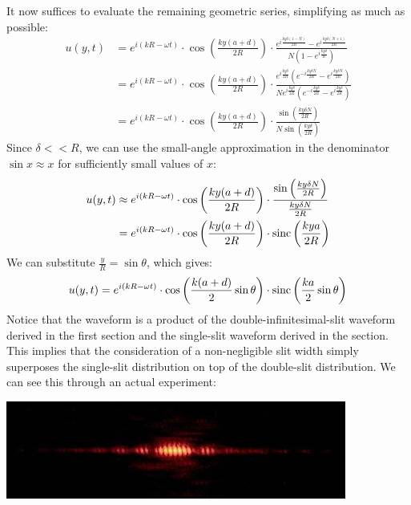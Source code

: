 It now suffices to evaluate the remaining geometric series, simplifying as much as possible: 
\begin{align*}
	u(y, t) &= e^{i(kR-\omega t)} \cdot \cos\left( \frac{ky(a+d)}{2R} \right) \cdot \frac{e^{i\frac{ky\delta (1-N)}{2R}} - e^{i\frac{ky\delta (N+1)}{2R}}}{N \left( 1 - e^{i\frac{ky\delta }{R}} \right)} \\
	&= e^{i(kR-\omega t)} \cdot \cos\left( \frac{ky(a+d)}{2R} \right) \cdot \frac{e^{i \frac{ky\delta}{2R}} \left(e^{-i\frac{ky\delta N}{2R}} - e^{i\frac{ky\delta N}{2R}}\right)}{N e^{i\frac{ky\delta }{2R}} \left( e^{-i\frac{ky\delta }{2R}} - e^{i\frac{ky\delta }{2R}} \right)} \\
	&= e^{i(kR-\omega t)} \cdot \cos\left( \frac{ky(a+d)}{2R} \right) \cdot \frac{\sin \left( \frac{ky\delta N}{2R} \right)}{N \sin \left( \frac{ky\delta }{2R} \right)}
\end{align*}
Since $\delta << R$, we can use the small-angle approximation in the denominator $\sin x \approx x$ for sufficiently small values of $x$: 
\begin{align*}
	u(y, t) &\approx e^{i(kR-\omega t)} \cdot \cos\left( \frac{ky(a+d)}{2R} \right) \cdot \frac{\sin \left( \frac{ky\delta N}{2R} \right)}{ \frac{ky\delta N}{2R} } \\
	&= e^{i(kR-\omega t)} \cdot \cos\left( \frac{ky(a+d)}{2R} \right) \cdot \operatorname{sinc} \left( \frac{kya}{2R} \right)
\end{align*}
We can substitute $\frac{y}{R} = \sin \theta$, which gives:
\[
	u(y, t) = e^{i(kR-\omega t)} \cdot \cos\left( \frac{k(a+d)}{2} \sin \theta \right) \cdot \operatorname{sinc} \left( \frac{ka}{2} \sin \theta \right)
\]
Notice that the waveform is a product of the double-infinitesimal-slit waveform derived in the first section and the single-slit waveform derived in the section. This implies that the consideration of a non-negligible slit width simply superposes the single-slit distribution on top of the double-slit distribution. We can see this through an actual experiment: 
\begin{center}
	\includegraphics[scale=0.7]{images/waves/doubleslitexp.jpg}\\
\end{center}
